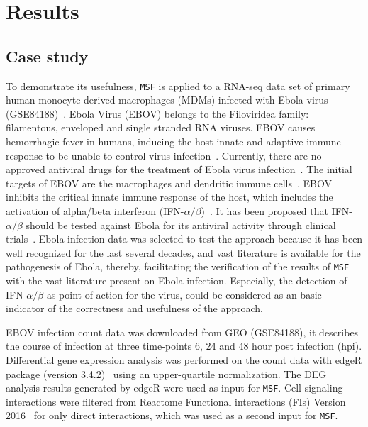 \documentclass[10pt,a4paper,twocolumn]{article}
\begin{document}
	
	\section*{Results}
	
	\subsection*{Case study}
	
	To demonstrate its usefulness, \texttt{MSF} is applied to a RNA-seq data
	set of primary human monocyte-derived macrophages (MDMs) infected with
	Ebola virus (GSE84188)~\cite{Olejnik}. Ebola Virus (EBOV) belongs to the Filoviridea family: filamentous, enveloped and single stranded RNA
	viruses. EBOV causes hemorrhagic fever in humans, inducing the host innate
	and adaptive immune response to be unable to control virus
	infection~\cite{Prins}. Currently, there are no approved antiviral drugs
	for the treatment of Ebola virus infection~\cite{Konde,Rhein}.  The initial
	targets of EBOV are the macrophages and dendritic immune
	cells~\cite{Falasca,Rhein}. EBOV inhibits the critical innate immune
	response of the host, which includes the activation of alpha/beta
	interferon (IFN-$\alpha / \beta$)~\cite{Prins,Konde,Cardenas}. It has been
	proposed that IFN-$\alpha / \beta$ should be tested against Ebola for its
	antiviral activity through clinical trials~\cite{Konde}. Ebola infection
	data was selected to test the approach because it has been well recognized for the last several decades, and vast literature is available for the pathogenesis of Ebola, thereby, facilitating the verification of the results of
	\texttt{MSF} with the vast literature present on Ebola
	infection. Especially, the detection of IFN-$\alpha / \beta$ as point of
	action for the virus, could be considered as an basic indicator of the
	correctness and usefulness of the approach.
	
	EBOV infection count data was downloaded from GEO (GSE84188), it describes the course of infection at three
	time-points 6, 24 and 48 hour post infection (hpi). Differential
	gene expression analysis was performed on the count data with edgeR package
	(version 3.4.2)~\cite{edgeR} using an upper-quartile normalization. The DEG analysis results generated by edgeR
	were used as input for \texttt{MSF}. Cell signaling interactions
	were filtered from Reactome Functional interactions (FIs) Version
	2016~\cite{Cytokegg} for only direct interactions, which was used as a second input for \texttt{MSF}.
	
\end{document}
